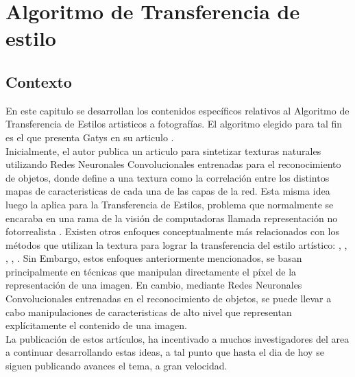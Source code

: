 \documentclass[a4paper,11pt,spanish]{book}
\begin{document}
\chapter{Algoritmo de Transferencia de estilo}

    \section{Contexto}
      En este capitulo se desarrollan los contenidos específicos relativos al Algoritmo de Transferencia de Estilos artisticos a fotografías. El algoritmo elegido para tal fin es el que
      presenta Gatys en su articulo \cite{Gatys:Neural_Style}. \\
      Inicialmente, el autor publica un articulo para sintetizar texturas naturales utilizando Redes Neuronales Convolucionales entrenadas para el reconocimiento de objetos,
      donde define a una textura como la correlación entre los distintos mapas de caracteristicas de cada una de las capas de la red.\cite{Gatys:Texture_Synthesis}
      Esta misma idea luego la aplica para la Transferencia de Estilos, problema que normalmente se encaraba en una rama de la visión de computadoras llamada representación
      no fotorrealista \cite{Kyprianidis:ArtisticStylization}. Existen otros enfoques conceptualmente más relacionados con los métodos que utilizan la textura para lograr la transferencia
      del estilo artístico: \cite{Hertzmann:ImageAnalogies}, \cite{Ashikhmin:FastTextureTransfer}, \cite{Efros:ImageQuilting}, \cite{Lee:DirectionalTextureTransfer},
      \cite{Xie:FGTS}. Sin Embargo, estos enfoques anteriormente mencionados, se basan principalmente en técnicas que manipulan directamente el píxel de la representación de una imagen. 
      En cambio, mediante Redes Neuronales Convolucionales entrenadas en el reconocimiento de objetos,  se puede llevar a cabo manipulaciones de caracteristicas de alto nivel que representan 
      explícitamente el contenido de una imagen. \\
      La publicación de estos artículos, ha incentivado a muchos investigadores del area a continuar desarrollando estas ideas, a tal punto que hasta el dia de hoy se siguen publicando
      avances el tema, a gran velocidad.
\end{document}
